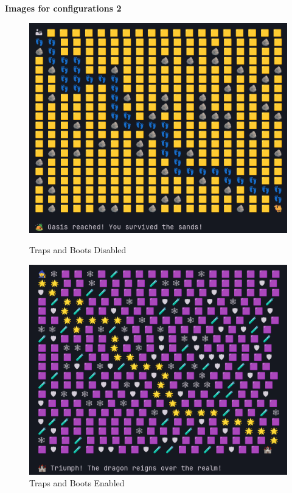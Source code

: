 \documentclass{article}
\begin{document}
\begin{itemize}
\hspace{4.5cm} \textbf{Images for configurations 2}

\begin{figure}[h]
    \centering
    \begin{minipage}{0.45\textwidth}
        \centering
        \includegraphics[width=\textwidth]{False2.png}
        \caption{Traps and Boots Disabled}
        \label{fig:traps_boots_disabled}
    \end{minipage}
    \hfill
    \begin{minipage}{0.45\textwidth}
        \centering
        \includegraphics[width=\textwidth]{True2.png}
        \caption{Traps and Boots Enabled}
        \label{fig:traps_boots_enabled}
    \end{minipage}
\end{figure}


\end{itemize}
\end{document}
